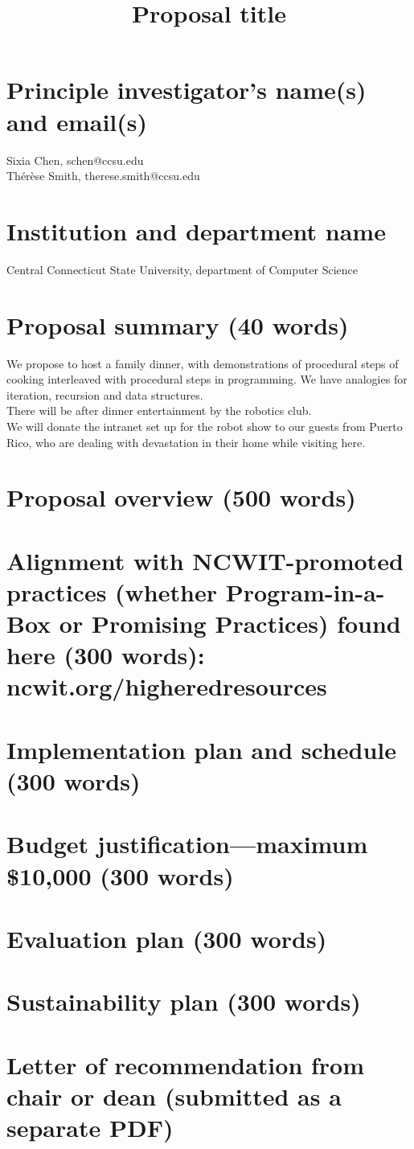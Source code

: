 \documentclass[]{article}
\title{Proposal title}
\author{}
\begin{document}
\maketitle

\begin{abstract}

\end{abstract}

\section{}

\section{Principle investigator’s name(s) and email(s)}
Sixia Chen, schen@ccsu.edu\\
Th\'er\`ese Smith, therese.smith@ccsu.edu
\section{Institution and department name}
Central Connecticut State University, department of Computer Science
\section{Proposal summary (40 words)}
We propose to host a family dinner, with demonstrations of procedural steps of cooking interleaved with procedural steps in programming. We have analogies for iteration, recursion and data structures.\\
There will be after dinner entertainment by the robotics club.\\
We will donate the intranet set up for the robot show to our guests from Puerto Rico, who are dealing with devastation in their home while visiting here.\\

\section{Proposal overview (500 words)}
\section{Alignment with NCWIT-promoted practices (whether Program-in-a-Box or Promising
Practices) found here (300 words): ncwit.org/higheredresources}

\section{Implementation plan and schedule (300 words)}
\section{Budget justification—maximum \$10,000 (300 words)}
\section{Evaluation plan (300 words)}
\section{Sustainability plan (300 words)}
\section{Letter of recommendation from chair or dean (submitted as a separate PDF)}
\end{document}
